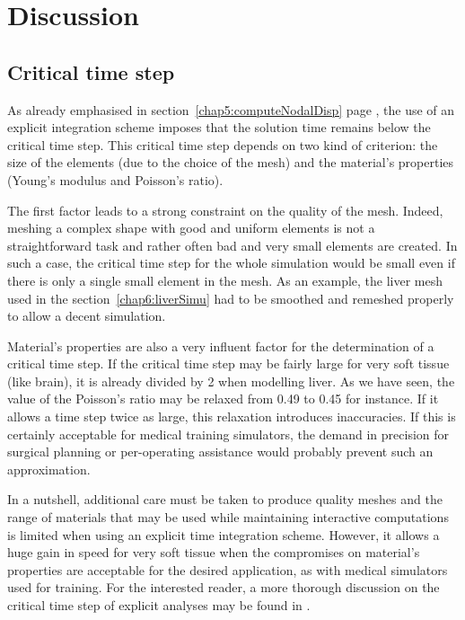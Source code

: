 	
\section{Discussion}

	\subsection{Critical time step}	\label{chap6:criticalTimestep}
As already emphasised in section~\ref{chap5:computeNodalDisp} page \pageref{chap5:discussionTimestep}, the use of an explicit integration scheme imposes that the solution time remains below the critical time step. This critical time step depends on two kind of criterion: the size of the elements (due to the choice of the mesh) and the material's properties (Young's modulus and Poisson's ratio).

The first factor leads to a strong constraint on the quality of the mesh. Indeed, meshing a complex shape with good and uniform elements is not a straightforward task and rather often bad and very small elements are created. In such a case, the critical time step for the whole simulation would be small even if there is only a single small element in the mesh. As an example, the liver mesh used in the section~\ref{chap6:liverSimu} had to be smoothed and remeshed properly to allow a decent simulation. 

Material's properties are also a very influent factor for the determination of a critical time step. If the critical time step may be fairly large for very soft tissue (like brain), it is already divided by 2 when modelling liver. As we have seen, the value of the Poisson's ratio may be relaxed from 0.49 to 0.45 for instance. If it allows a time step twice as large, this relaxation introduces inaccuracies. If this is certainly acceptable for medical training simulators, the demand in precision for surgical planning or per-operating assistance would probably prevent such an approximation. 

In a nutshell, additional care must be taken to produce quality meshes and the range of materials that may be used while maintaining interactive computations is limited when using an explicit time integration scheme. However, it allows a huge gain in speed for very soft tissue when the compromises on material's properties are acceptable for the desired application, as with medical simulators used for training. For the interested reader, a more thorough discussion on the critical time step of explicit analyses may be found in \cite{Taylor08}. 

